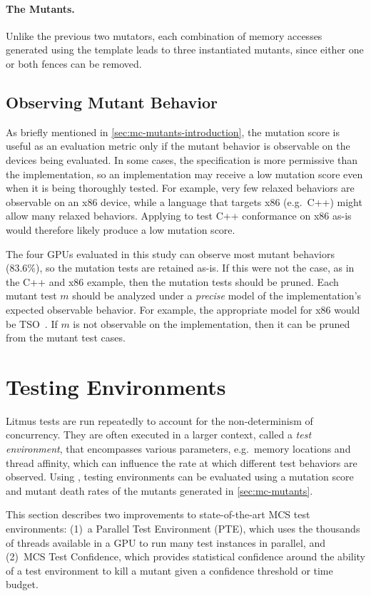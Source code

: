 \paragraph{The Mutants.}
Unlike the previous two mutators, each combination of memory accesses generated using the template leads to three instantiated mutants, since either one or both fences can be removed.

\subsection{Observing Mutant Behavior \label{sec:mc-mutants-observed-mutants}} As briefly mentioned in \mysec\ref{sec:mc-mutants-introduction}, the mutation score is useful as an evaluation metric only if the mutant behavior is observable on the devices being evaluated. In some cases, the specification is more permissive than the implementation, so an implementation may receive a low mutation score even when it is being thoroughly tested. For example, very few relaxed behaviors are observable on an x86 device, while a language that targets x86 (e.g.\ C++) might allow many relaxed behaviors. Applying \sys to test C++ conformance on x86 as-is would therefore likely produce a low mutation score.

The four GPUs evaluated in this study can observe most mutant behaviors (83.6\%), so the mutation tests are retained as-is. If this were not the case, as in the C++ and x86 example, then the mutation tests should be pruned. Each mutant test $m$ should be analyzed under a \textit{precise} model of the implementation's expected observable behavior. For example, the appropriate model for x86 would be TSO~\cite{owens2009x86}. If $m$ is not observable on the implementation, then it can be pruned from the mutant test cases.

\section{Testing Environments}
Litmus tests are run repeatedly to account for the non-determinism of concurrency. They are often executed in a larger context, called a \textit{test environment}, that encompasses various parameters, e.g.\  memory locations and thread affinity, which can influence the rate at which different test behaviors are observed. Using \sys, testing environments can be evaluated using a mutation score and mutant death rates of the mutants generated in \mysec\ref{sec:mc-mutants}.

This section describes two improvements to state-of-the-art MCS test environments: (1)~a Parallel Test Environment (PTE), which uses the thousands of threads available in a GPU to run many test instances in parallel, and (2)~MCS Test Confidence, which provides statistical confidence around the ability of a test environment to kill a mutant given a confidence threshold or time budget.

